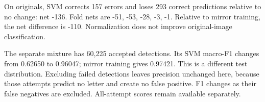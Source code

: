 On originals, SVM corrects 157 errors and loses 293 correct predictions relative to no change: net -136. Fold nets are -51, -53, -28, -3, -1. Relative to mirror training, the net difference is -110. Normalization does not improve original-image classification.

The separate mixture has 60,225 accepted detections. Its SVM macro-F1 changes from 0.62650 to 0.96047; mirror training gives 0.97421. This is a different test distribution. Excluding failed detections leaves precision unchanged here, because those attempts predict no letter and create no false positive. F1 changes as their false negatives are excluded. All-attempt scores remain available separately.
